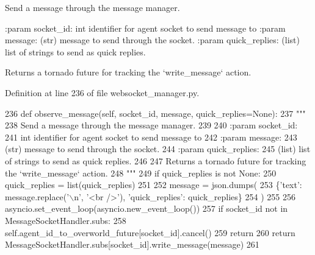 \begin{DoxyVerb}Send a message through the message manager.

:param socket_id:
    int identifier for agent socket to send message to
:param message:
    (str) message to send through the socket.
:param quick_replies:
    (list) list of strings to send as quick replies.

Returns a tornado future for tracking the `write_message` action.
\end{DoxyVerb}
 

Definition at line 236 of file websocket\+\_\+manager.\+py.


\begin{DoxyCode}
236     \textcolor{keyword}{def }observe\_message(self, socket\_id, message, quick\_replies=None):
237         \textcolor{stringliteral}{"""}
238 \textcolor{stringliteral}{        Send a message through the message manager.}
239 \textcolor{stringliteral}{}
240 \textcolor{stringliteral}{        :param socket\_id:}
241 \textcolor{stringliteral}{            int identifier for agent socket to send message to}
242 \textcolor{stringliteral}{        :param message:}
243 \textcolor{stringliteral}{            (str) message to send through the socket.}
244 \textcolor{stringliteral}{        :param quick\_replies:}
245 \textcolor{stringliteral}{            (list) list of strings to send as quick replies.}
246 \textcolor{stringliteral}{}
247 \textcolor{stringliteral}{        Returns a tornado future for tracking the `write\_message` action.}
248 \textcolor{stringliteral}{        """}
249         \textcolor{keywordflow}{if} quick\_replies \textcolor{keywordflow}{is} \textcolor{keywordflow}{not} \textcolor{keywordtype}{None}:
250             quick\_replies = list(quick\_replies)
251 
252         message = json.dumps(
253             \{\textcolor{stringliteral}{'text'}: message.replace(\textcolor{stringliteral}{'\(\backslash\)n'}, \textcolor{stringliteral}{'<br />'}), \textcolor{stringliteral}{'quick\_replies'}: quick\_replies\}
254         )
255 
256         asyncio.set\_event\_loop(asyncio.new\_event\_loop())
257         \textcolor{keywordflow}{if} socket\_id \textcolor{keywordflow}{not} \textcolor{keywordflow}{in} MessageSocketHandler.subs:
258             self.agent\_id\_to\_overworld\_future[socket\_id].cancel()
259             \textcolor{keywordflow}{return}
260         \textcolor{keywordflow}{return} MessageSocketHandler.subs[socket\_id].write\_message(message)
261 
\end{DoxyCode}
\mbox{\label{classparlai_1_1chat__service_1_1services_1_1websocket_1_1websocket__manager_1_1WebsocketManager_a71ce917832632d10f3aafd6e8644d3f5}} 
